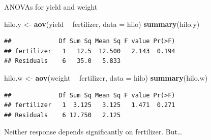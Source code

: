 \documentclass[ignorenonframetext,]{beamer}
\newenvironment{Shaded}{\begin{snugshade}}{\end{snugshade}}
\newcommand{\DataTypeTok}[1]{\textcolor[rgb]{0.13,0.29,0.53}{#1}}
\newcommand{\KeywordTok}[1]{\textcolor[rgb]{0.13,0.29,0.53}{\textbf{#1}}}
\newcommand{\NormalTok}[1]{#1}
\newcommand{\OperatorTok}[1]{\textcolor[rgb]{0.81,0.36,0.00}{\textbf{#1}}}
\newcommand{\StringTok}[1]{\textcolor[rgb]{0.31,0.60,0.02}{#1}}
\begin{document}
\begin{frame}[fragile]{ANOVAs for yield and weight}
\protect\hypertarget{anovas-for-yield-and-weight}{}

\small

\begin{Shaded}
\begin{Highlighting}[]
\NormalTok{hilo.y <-}\StringTok{ }\KeywordTok{aov}\NormalTok{(yield }\OperatorTok{~}\StringTok{ }\NormalTok{fertilizer, }\DataTypeTok{data =}\NormalTok{ hilo)}
\KeywordTok{summary}\NormalTok{(hilo.y)}
\end{Highlighting}
\end{Shaded}

\begin{verbatim}
##             Df Sum Sq Mean Sq F value Pr(>F)
## fertilizer   1   12.5  12.500   2.143  0.194
## Residuals    6   35.0   5.833
\end{verbatim}

\begin{Shaded}
\begin{Highlighting}[]
\NormalTok{hilo.w <-}\StringTok{ }\KeywordTok{aov}\NormalTok{(weight }\OperatorTok{~}\StringTok{ }\NormalTok{fertilizer, }\DataTypeTok{data =}\NormalTok{ hilo)}
\KeywordTok{summary}\NormalTok{(hilo.w)}
\end{Highlighting}
\end{Shaded}

\begin{verbatim}
##             Df Sum Sq Mean Sq F value Pr(>F)
## fertilizer   1  3.125   3.125   1.471  0.271
## Residuals    6 12.750   2.125
\end{verbatim}

\normalsize

Neither response depends significantly on fertilizer. But\ldots

\end{frame}
\end{document}
